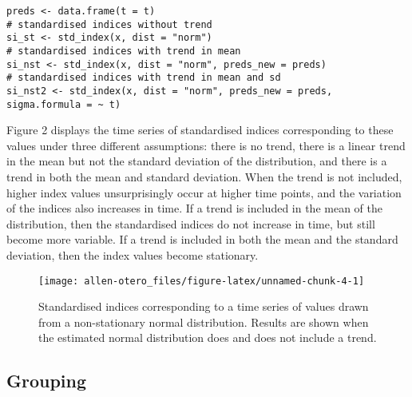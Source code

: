 \begin{verbatim}
preds <- data.frame(t = t)
# standardised indices without trend
si_st <- std_index(x, dist = "norm")
# standardised indices with trend in mean
si_nst <- std_index(x, dist = "norm", preds_new = preds)
# standardised indices with trend in mean and sd
si_nst2 <- std_index(x, dist = "norm", preds_new = preds, sigma.formula = ~ t)
\end{verbatim}

Figure 2 displays the time series of standardised indices corresponding to these values under three different assumptions: there is no trend, there is a linear trend in the mean but not the standard deviation of the distribution, and there is a trend in both the mean and standard deviation. When the trend is not included, higher index values unsurprisingly occur at higher time points, and the variation of the indices also increases in time. If a trend is included in the mean of the distribution, then the standardised indices do not increase in time, but still become more variable. If a trend is included in both the mean and the standard deviation, then the index values become stationary.

\begin{figure}

{\centering \texttt{[image: allen-otero\_files/figure-latex/unnamed-chunk-4-1]} 

}

\caption{Standardised indices corresponding to a time series of values drawn from a non-stationary normal distribution. Results are shown when the estimated normal distribution does and does not include a trend.}\label{fig:unnamed-chunk-4}
\end{figure}

\hypertarget{grouping}{%
\subsection{Grouping}\label{grouping}}

